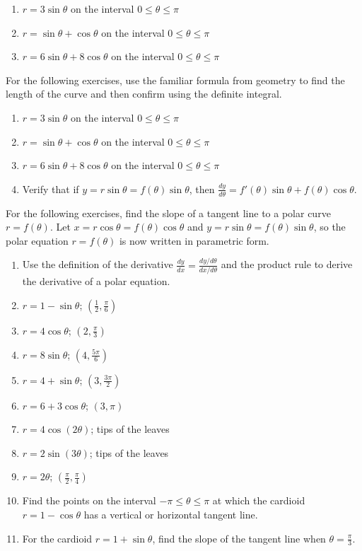 \documentclass{exercises}
\begin{document}
\begin{enumerate}[resume]
\item $r=3\sin \theta$ on the interval $0\le \theta \le \pi$
\item $r=\sin \theta+\cos \theta$ on the interval $0\le \theta \le \pi$
\item $r=6\sin \theta+8\cos \theta$ on the interval $0\le \theta \le \pi$
\end{enumerate}

For the following exercises, use the familiar formula from geometry to find the length of the curve and then confirm using the definite integral.

\begin{enumerate}[resume]
\item $r=3\sin \theta$ on the interval $0\le \theta \le \pi$
\item $r=\sin \theta+\cos \theta$ on the interval $0\le \theta \le \pi$
\item $r=6\sin \theta+8\cos \theta$ on the interval $0\le \theta \le \pi$
\item Verify that if $y=r\sin \theta=f(\theta)\sin \theta$, then $\frac{dy}{d\theta}=f'(\theta)\sin \theta+f(\theta)\cos \theta$.
\end{enumerate}

For the following exercises, find the slope of a tangent line to a polar curve $r=f(\theta)$. Let $x=r\cos \theta=f(\theta)\cos \theta$ and $y=r\sin \theta=f(\theta)\sin \theta$, so the polar equation $r=f(\theta)$ is now written in parametric form.

\begin{enumerate}[resume]
\item Use the definition of the derivative $\frac{dy}{dx}=\frac{dy/d\theta}{dx/d\theta}$ and the product rule to derive the derivative of a polar equation.
\item $r=1-\sin \theta$; $(\frac{1}{2},\frac{\pi}{6})$
\item $r=4\cos \theta$; $(2,\frac{\pi}{3})$
\item $r=8\sin \theta$; $(4,\frac{5\pi}{6})$
\item $r=4+\sin \theta$; $(3,\frac{3\pi}{2})$
\item $r=6+3\cos \theta$; $(3,\pi)$
\item $r=4\cos(2\theta)$; tips of the leaves
\item $r=2\sin(3\theta)$; tips of the leaves
\item $r=2\theta$; $(\frac{\pi}{2},\frac{\pi}{4})$
\item Find the points on the interval $-\pi \le \theta \le \pi$ at which the cardioid $r=1-\cos \theta$ has a vertical or horizontal tangent line.
\item For the cardioid $r=1+\sin \theta$, find the slope of the tangent line when $\theta=\frac{\pi}{3}$.
\end{enumerate}
\end{document}
